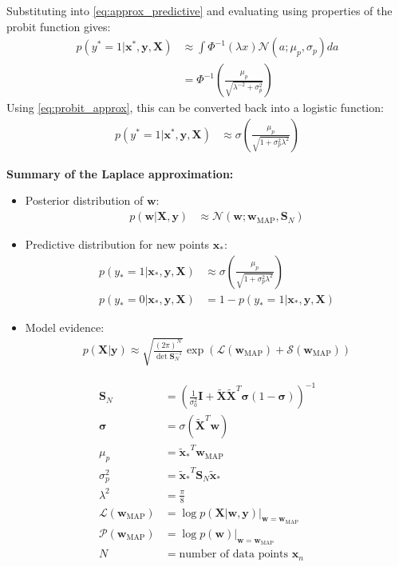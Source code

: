 \documentclass[a4paper]{article}
\begin{document}
    Substituting into \autoref{eq:approx_predictive} and evaluating using properties of the probit function gives:
    \begin{align}
         p(y^* = 1 | \bm{x}^*, \bm{y}, \bm{X}) &\approx \int \Phi^{-1}(\lambda x) \mathcal{N}(a; \mu_p, \sigma_p) da \nonumber \\
        &= \Phi^{-1}\left(\frac{\mu_p}{\sqrt{\lambda^{-2} + \sigma_p^2}}\right)
     \end{align}
    Using \autoref{eq:probit_approx}, this can be converted back into a logistic function:
    \begin{align}
        \label{eq:predictive_distribution}
         p(y^* = 1 | \bm{x}^*, \bm{y}, \bm{X}) &\approx \sigma\left(\frac{\mu_p}{\sqrt{1 + \sigma_p^2\lambda^2}}\right)
    \end{align}

    \noindent\textbf{Summary of the Laplace approximation:}
    \begin{itemize}
        \item Posterior distribution of $\bm{w}$:
        \begin{align}
            p(\bm{w} | \bm{X}, \bm{y}) &\approx \mathcal{N}(\bm{w}; \bm{w}_\text{MAP}, \bm{S}_N)
        \end{align}
        \noindent
        \item Predictive distribution for new points $\bm{x}_*$:
        \begin{align}
            p(y_* = 1 | \bm{x}_*, \bm{y}, \bm{X}) &\approx \sigma\left(\frac{\mu_p}{\sqrt{1 + \sigma_p^2\lambda^2}}\right) \\
            p(y_* = 0 | \bm{x}_*, \bm{y}, \bm{X}) &= 1 - p(y_* = 1 | \bm{x}_*, \bm{y}, \bm{X}) \nonumber
        \end{align}
        \item Model evidence:
        \begin{align}
            p(\bm{X} | \bm{y}) \approx \sqrt{\frac{(2\pi)^N}{\det \bm{S}_N^{-1}}}
                                 \exp \left(\mathcal{L}(\bm{w}_\text{MAP}) + \mathcal{S}(\bm{w}_\text{MAP})\right)
        \end{align}
    \end{itemize}

    \begin{align}
        \bm{S}_N &= \left(\frac{1}{\sigma_0^2}\bm{I} + \tilde{\bm{X}}\tilde{\bm{X}}^T \bm{\sigma} (1 - \bm{\sigma})\right)^{-1} \\
        \bm{\sigma} &= \sigma(\tilde{\bm{X}}^T \bm{w}) \\
        \mu_p &= {\tilde{\bm{x}}_*}^T \bm{w}_\text{MAP} \\
        \sigma_p^2 &= {\tilde{\bm{x}}_*}^T \bm{S}_N \tilde{\bm{x}}_* \\
        \lambda^2 &= \frac{\pi}{8} \\
        \mathcal{L}(\bm{w}_\text{MAP}) &= \log p(\bm{X} | \bm{w}, \bm{y}) \big|_{\bm{w} = \bm{w}_\text{MAP}} \\
        \mathcal{P}(\bm{w}_\text{MAP}) &= \log p(\bm{w}) \big|_{\bm{w} = \bm{w}_\text{MAP}} \\
        N &= \text{number of data points $\bm{x}_n$}
    \end{align}
\end{document}
